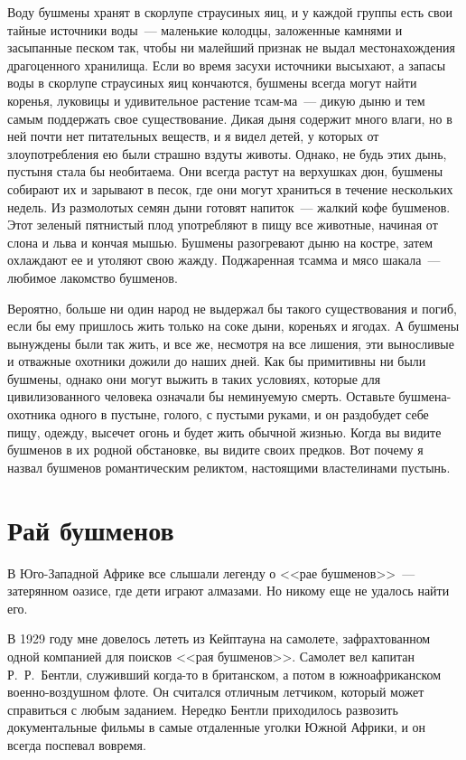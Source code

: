 \documentclass[12pt,a4paper,twoside,openany,svgnames]{memoir}
\begin{document}
Воду бушмены хранят в скорлупе страусиных яиц, и у каждой группы есть свои тайные источники воды~--- маленькие колодцы, заложенные камнями и засыпанные песком так, чтобы ни малейший признак не выдал местонахождения драгоценного хранилища. Если во время засухи источники высыхают, а запасы воды в скорлупе страусиных яиц кончаются, бушмены всегда могут найти коренья, луковицы и удивительное растение тсам-ма~--- дикую дыню и тем самым поддержать свое существование. Дикая дыня содержит много влаги, но в ней почти нет питательных веществ, и я видел детей, у которых от злоупотребления ею были страшно вздуты животы. Однако, не будь этих дынь, пустыня стала бы необитаема. Они всегда растут на верхушках дюн, бушмены собирают их и зарывают в песок, где они могут храниться в течение нескольких недель. Из размолотых семян дыни готовят напиток~--- жалкий кофе бушменов. Этот зеленый пятнистый плод употребляют в пищу все животные, начиная от слона и льва и кончая мышью. Бушмены разогревают дыню на костре, затем охлаждают ее и утоляют свою жажду. Поджаренная тсамма и мясо шакала~--- любимое лакомство бушменов.

Вероятно, больше ни один народ не выдержал бы такого существования и погиб, если бы ему пришлось жить только на соке дыни, кореньях и ягодах. А бушмены вынуждены были так жить, и все же, несмотря на все лишения, эти выносливые и отважные охотники дожили до наших дней. Как бы примитивны ни были бушмены, однако они могут выжить в таких условиях, которые для цивилизованного человека означали бы неминуемую смерть. Оставьте бушмена-охотника одного в пустыне, голого, с пустыми руками, и он раздобудет себе пищу, одежду, высечет огонь и будет жить обычной жизнью. Когда вы видите бушменов в их родной обстановке, вы видите своих предков. Вот почему я назвал бушменов романтическим реликтом, настоящими властелинами пустынь.



\chapter{Рай бушменов}

В Юго-Западной Африке все слышали легенду о <<рае бушменов>>~--- затерянном оазисе, где дети играют алмазами. Но никому еще не удалось найти его.

В 1929 году мне довелось лететь из Кейптауна на самолете, зафрахтованном одной компанией для поисков <<рая бушменов>>. Самолет вел капитан Р.~Р.~Бентли, служивший когда-то в британском, а потом в южноафриканском военно-воздушном флоте. Он считался отличным летчиком, который может справиться с любым заданием. Нередко Бентли приходилось развозить документальные фильмы в самые отдаленные уголки Южной Африки, и он всегда поспевал вовремя.
\end{document}
